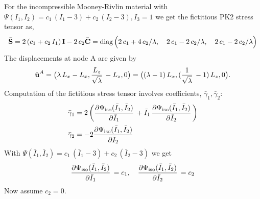 For the incompressible Mooney-Rivlin material with $\Psi(I_1,I_2) = c_1\,(I_1-3) + c_2\,(I_2 - 3), I_3 = 1$ we get the fictitious PK2 stress tensor as,
\begin{equation*}
  \begin{array}{lll}
    \bar{\textbf{S}} = 2\,(c_1 + c_2\,I_1)\,\textbf{I} - 2\,c_2\bar{\textbf{C}} = \hbox{diag} \,\Big(2\,c_1 + 4\,c_2/\lambda,\quad 2\,c_1 -2\,c_2/\lambda, \quad 2\,c_1 -2\,c_2/\lambda\Big)
  \end{array}
\end{equation*}
The displacements at node A are given by
\begin{equation*}
  \begin{array}{lll}
    \hat{\textbf{u}}^A = \big(\lambda\,L_x - L_x, \displaystyle\frac{\displaystyle{L_z}}{\displaystyle{\sqrt{\lambda}}}\, - L_z,0\big) = \big((\lambda-1)\,L_x,(\displaystyle\frac{\displaystyle{1}}{\displaystyle{\sqrt{\lambda}}}\,-1)\,L_z,0\big).
  \end{array}
\end{equation*}
Computation of the fictitious stress tensor involves coefficients, $\bar{\gamma}_1, \bar{\gamma}_2$:
\begin{equation*}
  \begin{array}{lll}
    \bar{\gamma}_1 = 2\left( \p{\Psi_\text{iso}(\bar{I}_1, \bar{I}_2)}{\bar{I}_1} + \bar{I}_1\,\p{\Psi_\text{iso}(\bar{I}_1, \bar{I}_2)}{\bar{I}_2} \right)\\[4mm]
    \bar{\gamma}_2 = -2\p{\Psi_\text{iso}(\bar{I}_1, \bar{I}_2)}{\bar{I}_2}
  \end{array}
\end{equation*}
With $\Psi(\bar{I}_1,\bar{I}_2) = c_1\,(\bar{I}_1-3) + c_2\,(\bar{I}_2 - 3)$ we get
\begin{equation*}
  \begin{array}{lll}
    \p{\Psi_\text{iso}(\bar{I}_1, \bar{I}_2)}{\bar{I}_1} = c_1, \quad \p{\Psi_\text{iso}(\bar{I}_1, \bar{I}_2)}{\bar{I}_2} = c_2
  \end{array}
\end{equation*}
Now assume $c_2 = 0$.

